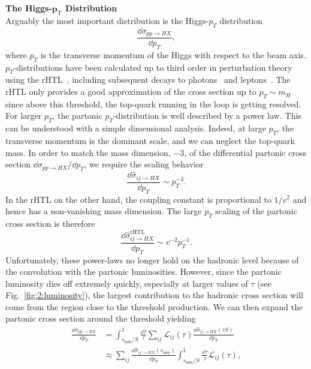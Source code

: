 \textbf{The Higgs-$\mathbf{p}_\mathrm{T}$ Distribution}\\
Arguably the most important distribution is the Higgs-$p_T$ distribution
\begin{equation}
\frac{\dd \sigma_{pp \rightarrow HX}}{\dd  p_T},
\end{equation}
where $p_T$ is the transverse momentum of the Higgs with respect to the beam axis. $p_T$-distributions have been calculated up to third order in perturbation theory using the \acs{rHTL}~\cite{Chen:2014gva,Becker:2020rjp}, including subsequent decays to photons~\cite{Chen:2021isd} and leptons~\cite{Chen:2019zel}. The \acs{rHTL} only provides a good approximation of the cross section up to $p_T \sim m_H$ since above this threshold, the top-quark running in the loop is getting resolved. For larger $p_T$, the partonic $p_T$-distribution is well described by a power law. This can be understood with a simple dimensional analysis. Indeed, at large $p_T$, the transverse momentum is the dominant scale, and we can neglect the top-quark mass. In order to match the mass dimension, $-3$, of the differential partonic cross section $\dd \sigma_{pp \rightarrow HX}/\dd p_T$, we require the scaling behavior
\begin{equation}
\frac{\dd \hat{\sigma}_{ij \rightarrow HX}}{\dd p_T} \sim  p_T^{-3}.
\end{equation}
In the \acs{rHTL} on the other hand, the coupling constant is proportional to $1/v^2$ and hence has a non-vanishing mass dimension. The large $p_T$ scaling of the partonic cross section is therefore
\begin{equation}
\frac{\dd \hat{\sigma}_{ij \rightarrow HX}^\mathrm{rHTL}}{\dd p_T} \sim v^{-2}p_T^{-1}.
\end{equation}
Unfortunately, these power-laws no longer hold on the hadronic level because of the convolution with the partonic luminosities. However, since the partonic luminosity dies off extremely quickly, especially at larger values of $\tau$ (see Fig.~\ref{fig:2:luminosity}), the largest contribution to the hadronic cross section will come from the region close to the threshold production. We can then expand the partonic cross section around the threshold yielding
\begin{equation}
\begin{split}
\frac{\dd \sigma_{pp \rightarrow HX}}{\dd p_T} &= \int_{s_\text{min}/S}^1 \frac{\dd \tau}{ \tau} \sum_{ij} \mathcal{L}_{ij}(\tau) \frac{\dd \hat{\sigma}_{ij \rightarrow HX} (\tau S)}{\dd p_T} \\
&\approx \sum_{ij} \frac{\dd \hat{\sigma}_{ij \rightarrow HX} (s_\text{min}) }{\dd p_T} \int_{s_\text{min}/S}^1 \frac{\dd \tau}{\tau} \mathcal{L}_{ij}(\tau),
\end{split}
\end{equation}
